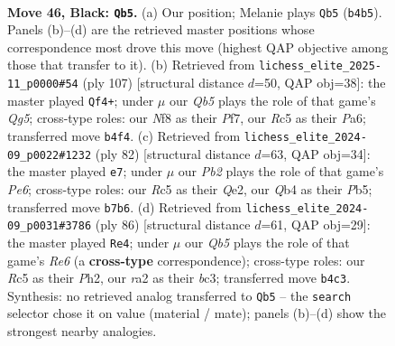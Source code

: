 \documentclass[11pt]{article}
\begin{document}
\clearpage

\begin{figure}[p]\centering
\begin{subfigure}{0.46\textwidth}\centering
\resizebox{\linewidth}{!}{%
\newchessgame
\chessboard[
  setfen={3Q1nk1/1p5p/8/2r4p/1q6/6N1/R5K1/7R b - - 5 46},
  showmover=false,
  pgfstyle=straightmove, color=movearrow, markmove={b4-b5}
]}
\caption{}
\end{subfigure}\hfill
\begin{subfigure}{0.46\textwidth}\centering
\resizebox{\linewidth}{!}{%
\newchessgame
\chessboard[
  setfen={8/4Qpk1/p1p2pp1/8/6qp/3R4/3K4/8 b - - 7 54},
  showmover=false,
  pgfstyle=straightmove, color=movearrow, markmove={g4-f4}
]}
\caption{}
\end{subfigure}
\\[4pt]
\begin{subfigure}{0.46\textwidth}\centering
\resizebox{\linewidth}{!}{%
\newchessgame
\chessboard[
  setfen={8/5Rpk/4P1n1/1P4q1/r7/6P1/4Q1PK/8 w - - 2 42},
  showmover=false,
  pgfstyle=straightmove, color=movearrow, markmove={e6-e7}
]}
\caption{}
\end{subfigure}\hfill
\begin{subfigure}{0.46\textwidth}\centering
\resizebox{\linewidth}{!}{%
\newchessgame
\chessboard[
  setfen={5rr1/2k5/4R3/3R2N1/5P2/1Pb5/5P1P/6K1 w - - 5 44},
  showmover=false,
  pgfstyle=straightmove, color=movearrow, markmove={e6-e4}
]}
\caption{}
\end{subfigure}
\caption{\textbf{Move 46, Black: \texttt{Qb5}.} (a) Our position; Melanie plays \texttt{Qb5} (\texttt{b4b5}). Panels (b)--(d) are the retrieved master positions whose correspondence most drove this move (highest QAP objective among those that transfer to it). (b) Retrieved from \texttt{lichess\_elite\_2025-11\_p0000\#54} (ply 107) [structural distance $d$=50, QAP obj=38]: the master played \texttt{Qf4+}; under $\mu$ our \emph{Qb5} plays the role of that game's \emph{Qg5}; cross-type roles: our \emph{N}f8 as their \emph{P}f7, our \emph{R}c5 as their \emph{P}a6; transferred move \texttt{b4f4}. (c) Retrieved from \texttt{lichess\_elite\_2024-09\_p0022\#1232} (ply 82) [structural distance $d$=63, QAP obj=34]: the master played \texttt{e7}; under $\mu$ our \emph{Pb2} plays the role of that game's \emph{Pe6}; cross-type roles: our \emph{R}c5 as their \emph{Q}e2, our \emph{Q}b4 as their \emph{P}b5; transferred move \texttt{b7b6}. (d) Retrieved from \texttt{lichess\_elite\_2024-09\_p0031\#3786} (ply 86) [structural distance $d$=61, QAP obj=29]: the master played \texttt{Re4}; under $\mu$ our \emph{Qb5} plays the role of that game's \emph{Re6} (a \textbf{cross-type} correspondence); cross-type roles: our \emph{R}c5 as their \emph{P}h2, our \emph{r}a2 as their \emph{b}c3; transferred move \texttt{b4c3}. Synthesis: no retrieved analog transferred to \texttt{Qb5} -- the \texttt{search} selector chose it on value (material / mate); panels (b)--(d) show the strongest nearby analogies.}
\label{fig:thought-m91}
\end{figure}
\end{document}
